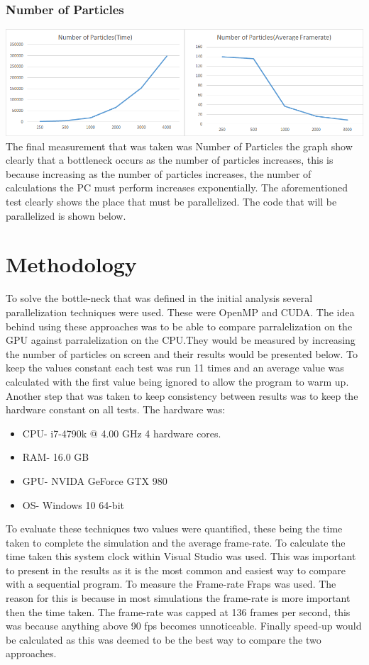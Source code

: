 \documentclass[12pt]{article}
\begin{document}
\subsubsection{ Number of Particles}
\includegraphics[scale=0.5]{pics/ianumber.png}
\newline
The final measurement that was taken was Number of Particles the graph show clearly that a bottleneck occurs as the number of particles increases, this is because increasing as the number of particles increases, the number of calculations the PC must perform  increases exponentially. The aforementioned test clearly shows the place that must be parallelized. The code that will be parallelized is shown below.

	
\section{Methodology}
To solve the bottle-neck that was defined in the initial analysis several parallelization techniques were used. These were OpenMP and CUDA. The idea behind using these approaches was to be able to compare parralelization on the GPU against  parralelization on the CPU.They would be measured by increasing the number of particles on screen and their results would be presented below.
\newline
To keep the values constant each test was run 11 times and an average value was calculated with the first value being ignored to allow the program to warm up. Another step that was taken to keep consistency between results was to keep the hardware constant on all tests. The hardware was:
\begin{itemize}
	\item CPU- i7-4790k @ 4.00 GHz 4 hardware cores.
	\item RAM- 16.0 GB
	\item GPU- NVIDA GeForce GTX 980
	\item OS- Windows 10 64-bit
\end{itemize}
 To evaluate these techniques two values were quantified, these being the time taken to complete the simulation and the average frame-rate. To calculate the time taken this system clock within Visual Studio was used. This was important to present in the results as it is the most common and easiest way to compare with a sequential program. To measure the Frame-rate Fraps was used. The reason for this is because in most simulations the frame-rate is more important then the time taken. The frame-rate was capped at 136 frames per second, this was because anything above 90 fps becomes unnoticeable.   Finally speed-up would be calculated as this was deemed to be the best way to compare the two approaches.
\end{document}
